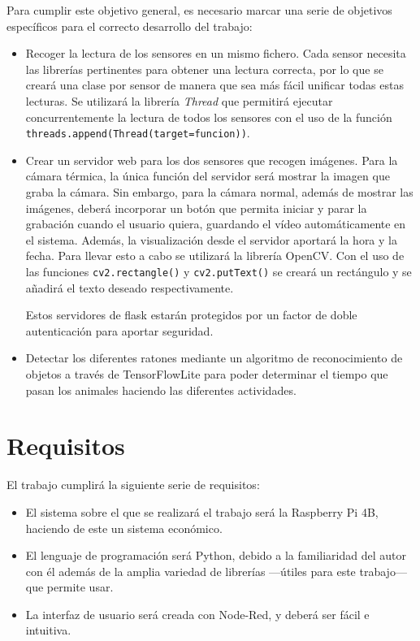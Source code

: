 Para cumplir este objetivo general, es necesario marcar una serie de objetivos específicos para el correcto desarrollo del trabajo:
\begin{itemize}
 \item Recoger la lectura de los sensores en un mismo fichero. Cada sensor necesita las librerías pertinentes para obtener una lectura correcta, por lo que se creará una clase por sensor de manera que sea más fácil unificar todas estas lecturas. Se utilizará la librería \textit{Thread} que permitirá ejecutar concurrentemente la lectura de todos los sensores con el uso de la función \verb|threads.append(Thread(target=funcion))|.
 \item Crear un servidor web para los dos sensores que recogen imágenes. Para la cámara térmica, la única función del servidor será mostrar la imagen que graba la cámara. Sin embargo, para la cámara normal, además de mostrar las imágenes, deberá incorporar un botón que permita iniciar y parar la grabación cuando el usuario quiera, guardando el vídeo automáticamente en el sistema. Además, la visualización desde el servidor aportará la hora y la fecha. Para llevar esto a cabo se utilizará la librería OpenCV. Con el uso de las funciones \verb|cv2.rectangle()| y \verb|cv2.putText()| se creará un rectángulo y se añadirá el texto deseado respectivamente.
 
 Estos servidores de flask estarán protegidos por un factor de doble autenticación para aportar seguridad.
 \item Detectar los diferentes ratones mediante un algoritmo de reconocimiento de objetos a través de TensorFlowLite para poder determinar el tiempo que pasan los animales haciendo las diferentes actividades.
\end{itemize}

\section{Requisitos}
\label{sec:requisitos}
El trabajo cumplirá la siguiente serie de requisitos:
\begin{itemize}
 \item El sistema sobre el que se realizará el trabajo será la Raspberry Pi 4B, haciendo de este un sistema económico. 
 \item El lenguaje de programación será Python, debido a la familiaridad del autor con él además de la amplia variedad de librerías ---útiles para este trabajo--- que permite usar.
 \item La interfaz de usuario será creada con Node-Red, y deberá ser fácil e intuitiva.
\end{itemize}

